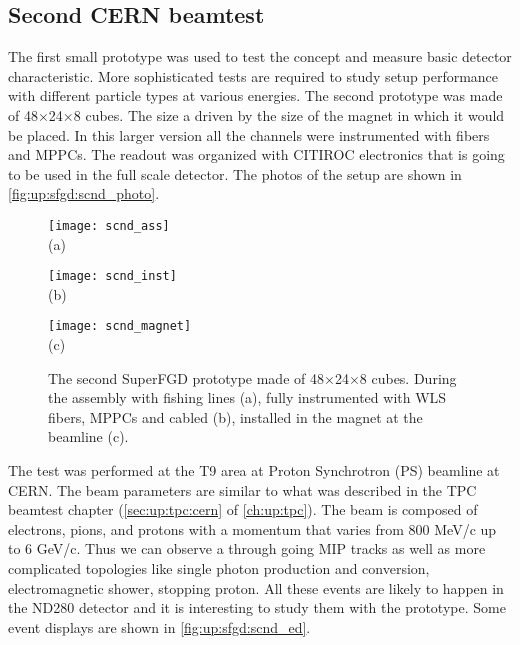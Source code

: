\documentclass[main.tex]{subfiles}
\begin{document}
\subsection{Second CERN beamtest}
\label{sec:up:sfgd:beam2}
The first small prototype was used to test the concept and measure basic detector characteristic. More sophisticated tests are required to study setup performance with different particle types at various energies. The second prototype was made of 48$\times$24$\times$8 cubes. The size a driven by the size of the magnet in which it would be placed. In this larger version all the channels were instrumented with fibers and MPPCs. The readout was organized with CITIROC electronics that is going to be used in the full scale detector. The photos of the setup are shown in \autoref{fig:up:sfgd:scnd_photo}.

\begin{figure}[!ht]
	\centering
	\begin{minipage}{0.26\linewidth}
		\centering
		\texttt{[image: scnd\_ass]} \\ (a)
	\end{minipage}
	\begin{minipage}{0.36\linewidth}
		\centering
		\texttt{[image: scnd\_inst]} \\ (b)
	\end{minipage}
	\begin{minipage}{0.36\linewidth}
		\centering
		\texttt{[image: scnd\_magnet]} \\ (c)
	\end{minipage}
	\caption{The second SuperFGD prototype made of 48$\times$24$\times$8 cubes. During the assembly with fishing lines (a), fully instrumented with WLS fibers, MPPCs and cabled (b), installed in the magnet at the beamline (c).}
	\label{fig:up:sfgd:scnd_photo}
\end{figure}

The test was performed at the T9 area at Proton Synchrotron (PS) beamline at CERN. The beam parameters are similar to what was described in the TPC beamtest chapter (\autoref{sec:up:tpc:cern} of \autoref{ch:up:tpc}). The beam is composed of electrons, pions, and protons with a momentum that varies from 800 MeV/c up to 6 GeV/c. Thus we can observe a through going MIP tracks as well as more complicated topologies like single photon production and conversion, electromagnetic shower, stopping proton. All these events are likely to happen in the ND280 detector and it is interesting to study them with the prototype. Some event displays are shown in \autoref{fig:up:sfgd:scnd_ed}.
\end{document}
